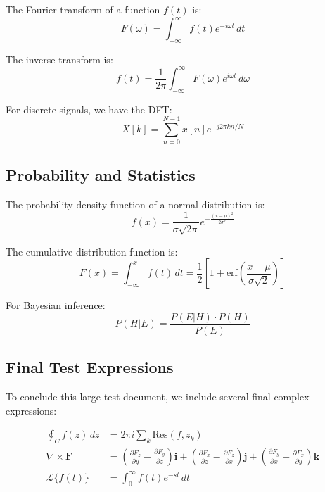 \documentclass[12pt]{article}
\begin{document}
The Fourier transform of a function $f(t)$ is:
\begin{equation}
F(\omega) = \int_{-\infty}^{\infty} f(t) e^{-i\omega t} \, dt
\end{equation}

The inverse transform is:
\begin{equation}
f(t) = \frac{1}{2\pi} \int_{-\infty}^{\infty} F(\omega) e^{i\omega t} \, d\omega
\end{equation}

For discrete signals, we have the DFT:
\begin{equation}
X[k] = \sum_{n=0}^{N-1} x[n] e^{-j2\pi kn/N}
\end{equation}

\subsection{Probability and Statistics}

The probability density function of a normal distribution is:
\begin{equation}
f(x) = \frac{1}{\sigma\sqrt{2\pi}} e^{-\frac{(x-\mu)^2}{2\sigma^2}}
\end{equation}

The cumulative distribution function is:
\begin{equation}
F(x) = \int_{-\infty}^{x} f(t) \, dt = \frac{1}{2}\left[1 + \text{erf}\left(\frac{x-\mu}{\sigma\sqrt{2}}\right)\right]
\end{equation}

For Bayesian inference:
\begin{equation}
P(H|E) = \frac{P(E|H) \cdot P(H)}{P(E)}
\end{equation}

\subsection{Final Test Expressions}

To conclude this large test document, we include several final complex expressions:

\begin{align}
\oint_C f(z) \, dz &= 2\pi i \sum_k \text{Res}(f, z_k) \\
\nabla \times \mathbf{F} &= \left(\frac{\partial F_z}{\partial y} - \frac{\partial F_y}{\partial z}\right)\mathbf{i} + \left(\frac{\partial F_x}{\partial z} - \frac{\partial F_z}{\partial x}\right)\mathbf{j} + \left(\frac{\partial F_y}{\partial x} - \frac{\partial F_x}{\partial y}\right)\mathbf{k} \\
\mathcal{L}\{f(t)\} &= \int_0^{\infty} f(t) e^{-st} \, dt
\end{align}
\end{document}
